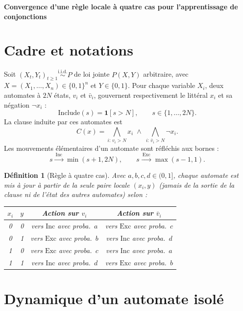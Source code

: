\documentclass[12pt,a4paper]{article}
\newtheorem{definition}[theorem]{Définition}
\theoremstyle{remark}
\newcommand{\Inc}{\ensuremath{\mathrm{Inc}}}
\newcommand{\Exc}{\ensuremath{\mathrm{Exc}}}
\newcommand{\vbar}{\bar{v}}
\begin{document}
\begin{center}
{\LARGE\bfseries Convergence d'une règle locale à quatre cas pour l'apprentissage de conjonctions}
\end{center}
\vspace{1em}

\section{Cadre et notations}

Soit $(X_t,Y_t)_{t\ge1}\overset{\mathrm{i.i.d.}}{\sim}P$ de loi jointe
$P(X,Y)$ arbitraire, avec $X=(X_1,\ldots,X_n)\in\{0,1\}^n$ et $Y\in\{0,1\}$.
Pour chaque variable $X_i$, deux automates à $2N$ états, $v_i$ et $\vbar_i$,
gouvernent respectivement le littéral $x_i$ et sa négation $\neg x_i$ :
\[
  \mathrm{Include}(s) = \mathbf 1[s>N], \qquad s\in\{1,\ldots,2N\}.
\]
La clause induite par ces automates est
\[
  C(x) = \bigwedge_{i:\,v_i>N} x_i \;\wedge\; \bigwedge_{i:\,\vbar_i>N} \neg x_i.
\]
Les mouvements élémentaires d'un automate sont réfléchis aux bornes :
\[
  s \xrightarrow{\ \Inc\ } \min(s+1,2N), \qquad
  s \xrightarrow{\ \Exc\ } \max(s-1,1).
\]

\begin{definition}[Règle à quatre cas]\label{def:regle}
Avec $a,b,c,d\in(0,1]$, chaque automate est mis à jour à partir de la seule
paire locale $(x_i,y)$ (jamais de la sortie de la clause ni de l'état des
autres automates) selon :
\begin{center}
\begin{tabular}{cccc}
\toprule
$x_i$ & $y$ & Action sur $v_i$ & Action sur $\vbar_i$ \\
\midrule
0 & 0 & vers $\Inc$ avec proba.\ $a$ & vers $\Exc$ avec proba.\ $c$ \\
0 & 1 & vers $\Exc$ avec proba.\ $b$ & vers $\Inc$ avec proba.\ $d$ \\
1 & 0 & vers $\Exc$ avec proba.\ $c$ & vers $\Inc$ avec proba.\ $a$ \\
1 & 1 & vers $\Inc$ avec proba.\ $d$ & vers $\Exc$ avec proba.\ $b$ \\
\bottomrule
\end{tabular}
\end{center}
\end{definition}

\section{Dynamique d'un automate isolé}
\end{document}
